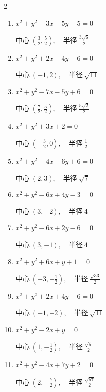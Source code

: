 \begin{multicols}{2}
\begin{enumerate}
  \item $x^{2}+y^{2}-3x-5y-5=0$

        $\displaystyle 中心\: \left(\frac{3}{2},\frac{5}{2}\right), \quad 半径 \ \frac{3\sqrt{6}}{2}$

  \item $x^{2}+y^{2}+2x-4y-6=0$

        $\displaystyle 中心\: \left(-1,2\right), \quad 半径 \ \sqrt{11}$

  \item $x^{2}+y^{2}-7x-5y+6=0$

        $\displaystyle 中心\: \left(\frac{7}{2},\frac{5}{2}\right), \quad 半径 \ \frac{5\sqrt{2}}{2}$

  \item $x^{2}+y^{2}+3x+2=0$

        $\displaystyle 中心\: \left(-\frac{3}{2},0\right), \quad 半径 \ \frac{1}{2}$

  \item $x^{2}+y^{2}-4x-6y+6=0$

        $\displaystyle 中心\: \left(2,3\right), \quad 半径 \ \sqrt{7}$

  \item $x^{2}+y^{2}-6x+4y-3=0$

        $\displaystyle 中心\: \left(3,-2\right), \quad 半径 \ 4$

  \item $x^{2}+y^{2}-6x+2y-6=0$

        $\displaystyle 中心\: \left(3,-1\right), \quad 半径 \ 4$

  \item $x^{2}+y^{2}+6x+y+1=0$

        $\displaystyle 中心\: \left(-3,-\frac{1}{2}\right), \quad 半径 \ \frac{\sqrt{33}}{2}$

  \item $x^{2}+y^{2}+2x+4y-6=0$

        $\displaystyle 中心\: \left(-1,-2\right), \quad 半径 \ \sqrt{11}$

\columnbreak %

\resetques

  \item $x^{2}+y^{2}-2x+y=0$

        $\displaystyle 中心\: \left(1,-\frac{1}{2}\right), \quad 半径 \ \frac{\sqrt{5}}{2}$

  \item $x^{2}+y^{2}-4x+7y+2=0$

        $\displaystyle 中心\: \left(2,-\frac{7}{2}\right), \quad 半径 \ \frac{\sqrt{57}}{2}$


\end{enumerate}
\end{multicols}
